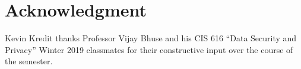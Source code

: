 \documentclass[journal]{IEEEtran}
\begin{document}





\section*{Acknowledgment}
Kevin Kredit thanks Professor Vijay Bhuse and his CIS 616 ``Data Security and Privacy'' Winter 2019
classmates for their constructive input over the course of the semester.
\end{document}
